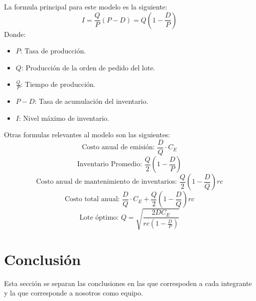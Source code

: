 \documentclass[letterpaper, 12pt]{article}
\begin{document}
    La formula principal para este modelo es la siguiente:
    \[I=\frac{Q}{P}(P-D)=Q(1-\frac{D}{P})\]
    Donde:
    \begin{itemize}
        \item \(P\): Tasa de producción.
        \item \(Q\): Producción de la orden de pedido del lote.
        \item \(\frac{Q}{P}\): Tiempo de producción.
        \item \(P-D\): Tasa de acumulación del inventario.
        \item \(I\): Nivel máximo de inventario.
    \end{itemize}
    Otras formulas relevantes al modelo son las siguientes:
    \[\text{Costo anual de emisión: }\frac{D}{Q}\cdot C_E\]
    \[\text{Inventario Promedio: }\frac{Q}{2}\left(1-\frac{D}{P}\right)\]
    \[\text{Costo anual de mantenimiento de inventarios: }\frac{Q}{2}\left(1-\frac{D}{Q}\right)rc\]
    \[\text{Costo total anual: }\frac{D}{Q}\cdot C_E+\frac{Q}{2}\left(1-\frac{D}{Q}\right)rc\]
    \[\text{Lote óptimo: }Q=\sqrt{\frac{2DC_E}{rc\left(1-\frac{D}{P}\right)}}\]
    \newpage
    \section*{Conclusión}
    \justify
    Esta sección se separan las conclusiones en las que correspoden a cada integrante y la que corresponde a nosotros como equipo. 
\end{document}
